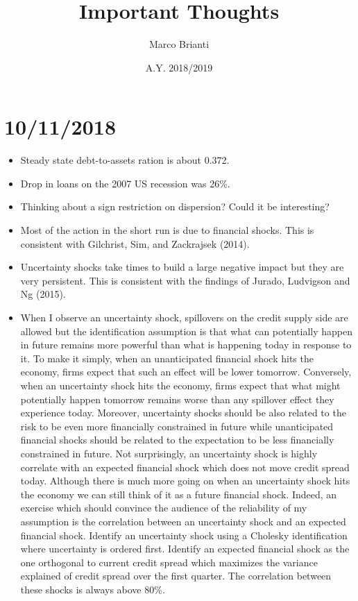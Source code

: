 \documentclass{article}
\title{Important Thoughts}
\author{Marco Brianti}
\date{A.Y. 2018/2019}
\begin{document}
	\large{

\maketitle

\section*{10/11/2018}

\begin{itemize}
	\item Steady state debt-to-assets ration is about 0.372.
	\item Drop in loans on the 2007 US recession was 26\%.
	\item Thinking about a sign restriction on dispersion? Could it be interesting?
	\item Most of the action in the short run is due to financial shocks. This is consistent with Gilchrist, Sim, and Zackrajsek (2014).
	\item Uncertainty shocks take times to build a large negative impact but they are very persistent. This is consistent with the findings of Jurado, Ludvigson and Ng (2015).
	\item When I observe an uncertainty shock, spillovers on the credit supply side are allowed but the identification assumption is that what can potentially happen in future remains more powerful than what is happening today in response to it. To make it simply, when an unanticipated financial shock hits the economy, firms expect that such an effect will be lower tomorrow. Conversely, when an uncertainty shock hits the economy, firms expect that what might potentially happen tomorrow remains worse than any spillover effect they experience today. Moreover, uncertainty shocks should be also related to the risk to be even more financially constrained in future while unanticipated financial shocks should be related to the expectation to be less financially constrained in future. Not surprisingly, an uncertainty shock is highly correlate with an expected financial shock which does not move credit spread today. Although there is much more going on when an uncertainty shock hits the economy we can still think of it as a future financial shock. Indeed, an exercise which should convince the audience of the reliability of my assumption is the correlation between an uncertainty shock and an expected financial shock. Identify an uncertainty shock using a Cholesky identification where uncertainty is ordered first. Identify an expected financial shock as the one orthogonal to current credit spread which maximizes the variance explained of credit spread over the first quarter. The correlation between these shocks is always above 80\%.

\end{itemize}}
\end{document}

